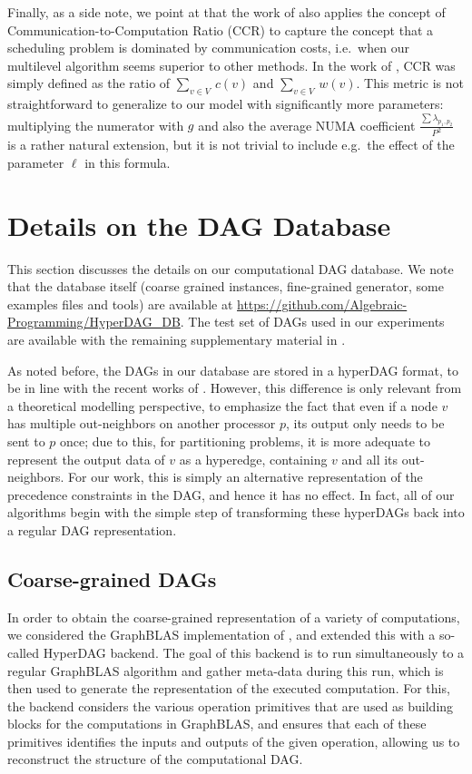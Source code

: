 \documentclass[sigconf,nonacm]{acmart}
\begin{document}
Finally, as a side note, we point at that the work of \cite{SPD} also applies the concept of Communication-to-Computation Ratio (CCR) to capture the concept that a scheduling problem is dominated by communication costs, i.e.\ when our multilevel algorithm seems superior to other methods. In the work of \cite{SPD}, CCR was simply defined as the ratio of $\sum_{v \in V} \, c(v)$ and $\sum_{v \in V} \, w(v)$. This metric is not straightforward to generalize to our model with significantly more parameters: multiplying the numerator with $g$ and also the average NUMA coefficient $\frac{\sum \lambda_{p_1, p_2}}{P^2}$ is a rather natural extension, but it is not trivial to include e.g.\ the effect of the parameter $\ell$ in this formula.

\section{Details on the DAG Database} \label{app:database}

This section discusses the details on our computational DAG database. We note that the database itself (coarse grained instances, fine-grained generator, some examples files and tools) are available at \url{https://github.com/Algebraic-Programming/HyperDAG_DB}. The test set of DAGs used in our experiments are available with the remaining supplementary material in \cite{folder}.

As noted before, the DAGs in our database are stored in a hyperDAG format, to be in line with the recent works of \cite{hyperDAG, DAH}. However, this difference is only relevant from a theoretical modelling perspective, to emphasize the fact that even if a node $v$ has multiple out-neighbors on another processor $p$, its output only needs to be sent to $p$ once; due to this, for partitioning problems, it is more adequate to represent the output data of $v$ as a hyperedge, containing $v$ and all its out-neighbors. For our work, this is simply an alternative representation of the precedence constraints in the DAG, and hence it has no effect. In fact, all of our algorithms begin with the simple step of transforming these hyperDAGs back into a regular DAG representation.

\subsection{Coarse-grained DAGs}

In order to obtain the coarse-grained representation of a variety of computations, we considered the GraphBLAS implementation of \cite{alp1}, and extended this with a so-called HyperDAG backend. The goal of this backend is to run simultaneously to a regular GraphBLAS algorithm and gather meta-data during this run, which is then used to generate the representation of the executed computation. For this, the backend considers the various operation primitives that are used as building blocks for the computations in GraphBLAS, and ensures that each of these primitives identifies the inputs and outputs of the given operation, allowing us to reconstruct the structure of the computational DAG. 
\end{document}
